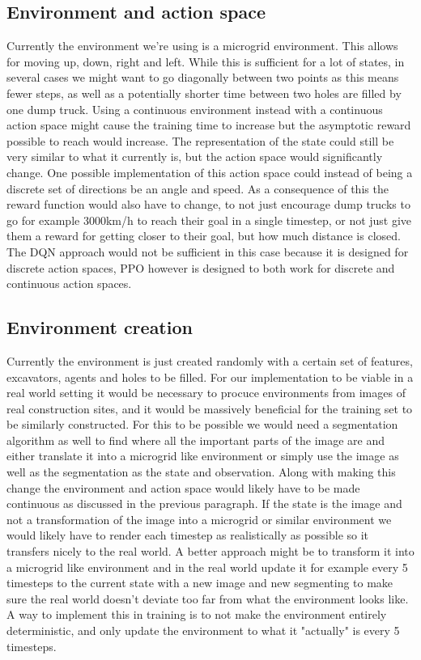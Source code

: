 \documentclass[conference]{IEEEtran}
\begin{document}
	\subsection{Environment and action space}
	Currently the environment we're using is a microgrid environment. This allows for moving up, down, right and left.
	While this is sufficient for a lot of states, in several cases we might want to go diagonally between two points as this means fewer steps, as well as a potentially shorter time between two holes are filled by one dump truck.
	Using a continuous environment instead with a continuous action space might cause the training time to increase but the asymptotic reward possible to reach would increase. The representation of the state could still be very similar to what it currently is, but the action space would significantly change.
	One possible implementation of this action space could instead of being a discrete set of directions be an angle and speed.
	As a consequence of this the reward function would also have to change, to not just encourage dump trucks to go for example 3000km/h to reach their goal in a single timestep, or not just give them a reward for getting closer to their goal, but how much distance is closed.
	The DQN approach would not be sufficient in this case because it is designed for discrete action spaces, PPO however is designed to both work for discrete and continuous action spaces.

	\subsection{Environment creation}
	Currently the environment is just created randomly with a certain set of features, excavators, agents and holes to be filled.
	For our implementation to be viable in a real world setting it would be necessary to procuce environments from images of real construction sites, and it would be massively beneficial for the training set to be similarly constructed.
	For this to be possible we would need a segmentation algorithm as well to find where all the important parts of the image are and either translate it into a microgrid like environment or simply use the image as well as the segmentation as the state and observation.
	Along with making this change the environment and action space would likely have to be made continuous as discussed in the previous paragraph.
	If the state is the image and not a transformation of the image into a microgrid or similar environment we would likely have to render each timestep as realistically as possible so it transfers nicely to the real world.
	A better approach might be to transform it into a microgrid like environment and in the real world update it for example every 5 timesteps to the current state with a new image and new segmenting to make sure the real world doesn't deviate too far from what the environment looks like.
	A way to implement this in training is to not make the environment entirely deterministic, and only update the environment to what it "actually" is every 5 timesteps.
\end{document}
